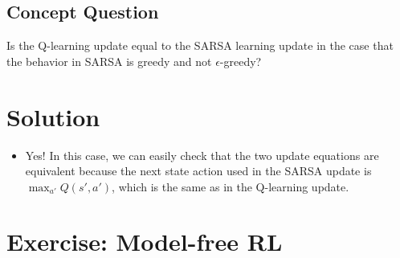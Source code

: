 \documentclass[11pt, letterpaper]{article}
\newenvironment{solution}
  {\color{blue}\section*{Solution}}
{}
\begin{document}
  \subsection{Concept Question}

  Is the Q-learning update equal to the SARSA learning update in the
  case that the behavior in SARSA is greedy and not $\epsilon$-greedy?
%
\begin{solution}
      \begin{itemize}
  \item Yes! In this case, we can easily check that the two
      update equations are equivalent because the next state action
      used  in the  SARSA update is $\max_{a'}Q(s',a')$, which is the same
      as in the Q-learning update.
  \end{itemize}
\end{solution}

\section{Exercise: Model-free RL}
\end{document}

